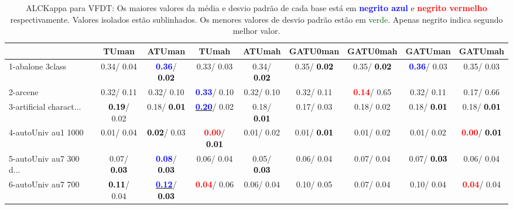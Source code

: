 \begin{table}[h]
\caption{ALCKappa para VFDT: Os maiores valores da média e desvio padrão de cada base está em \textcolor{blue}{\textbf{negrito azul}} e \textcolor{red}{\textbf{negrito vermelho}} respectivamente. Valores isolados estão sublinhados. Os menores valores de desvio padrão estão em \textcolor{darkgreen}{verde}. Apenas negrito indica segundo melhor valor.}
\begin{center}\begin{tabular}{lc|c|c|c|c|c|c|c}
 & TUman & \textbf{ATUman} & TUmah & \textbf{ATUmah} & GATU0man & GATU0mah & GATUman & GATUmah\\ \hline 1-abalone 3class &   0.34/  0.04 & \textcolor{blue}{\textbf{  0.36}}/\textcolor{black}{\textbf{  0.02}} &   0.33/  0.03 &   0.34/\textcolor{black}{\textbf{  0.02}} &   0.35/\textcolor{black}{\textbf{  0.02}} &   0.35/\textcolor{black}{\textbf{  0.02}} & \textcolor{blue}{\textbf{  0.36}}/  0.03 &   0.35/  0.03 \\
2-arcene &   0.32/  0.11 &   0.32/  0.10 & \textcolor{blue}{\textbf{  0.33}}/  0.10 &   0.32/  0.10 &   0.32/  0.11 & \textcolor{red}{\textbf{  0.14}}/  0.65 &   0.32/  0.11 &   0.17/  0.66 \\
3-artificial charact... & \textcolor{black}{\textbf{  0.19}}/  0.02 &   0.18/\textcolor{black}{\textbf{  0.01}} & \underline{\textcolor{blue}{\textbf{  0.20}}}/  0.02 &   0.18/\textcolor{black}{\textbf{  0.01}} &   0.17/  0.03 &   0.18/  0.02 &   0.18/\textcolor{black}{\textbf{  0.01}} &   0.18/\textcolor{black}{\textbf{  0.01}} \\
4-autoUniv au1 1000 &   0.01/  0.04 & \textcolor{black}{\textbf{  0.02}}/  0.03 & \textcolor{red}{\textbf{  0.00}}/\textcolor{black}{\textbf{  0.01}} &   0.01/  0.02 &   0.01/\textcolor{black}{\textbf{  0.01}} &   0.01/  0.02 &   0.01/  0.02 & \textcolor{red}{\textbf{  0.00}}/\textcolor{black}{\textbf{  0.01}} \\
5-autoUniv au7 300 d... &   0.07/\textcolor{black}{\textbf{  0.03}} & \textcolor{blue}{\textbf{  0.08}}/\textcolor{black}{\textbf{  0.03}} &   0.06/  0.04 &   0.05/\textcolor{black}{\textbf{  0.03}} &   0.06/  0.04 &   0.07/  0.04 &   0.07/\textcolor{black}{\textbf{  0.03}} &   0.06/  0.04 \\
6-autoUniv au7 700 & \textcolor{black}{\textbf{  0.11}}/  0.04 & \underline{\textcolor{blue}{\textbf{  0.12}}}/\textcolor{black}{\textbf{  0.03}} & \textcolor{red}{\textbf{  0.04}}/  0.06 &   0.06/  0.04 &   0.10/  0.05 &   0.07/  0.04 &   0.10/  0.04 & \textcolor{red}{\textbf{  0.04}}/  0.04 \\

\end{tabular}
\end{center}
\end{table}
